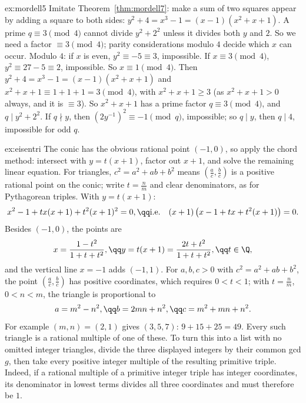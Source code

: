 \begin{solution}{ex:mordell5}
\idea Imitate Theorem~\ref{thm:mordell7}: make a sum of two squares appear by adding a square to both sides: $y^2+4=x^3-1=(x-1)(x^2+x+1)$. A prime $q\equiv3\pmod4$ cannot divide $y^2+2^2$ unless it divides both $y$ and $2$. So we need a factor $\equiv3\pmod4$; parity considerations modulo $4$ decide which $x$ can occur.
\writeup Modulo $4$: if $x$ is even, $y^2\equiv-5\equiv3$, impossible. If $x\equiv3\pmod4$, $y^2\equiv27-5\equiv2$, impossible. So $x\equiv1\pmod4$. Then $y^2+4=x^3-1=(x-1)(x^2+x+1)$ and $x^2+x+1\equiv1+1+1=3\pmod4$, with $x^2+x+1\ge3$ (as $x^2+x+1>0$ always, and it is $\equiv3$). So $x^2+x+1$ has a prime factor $q\equiv3\pmod4$, and $q\mid y^2+2^2$. If $q\nmid y$, then $\left(2y^{-1}\right)^2\equiv-1\pmod q$, impossible; so $q\mid y$, then $q\mid4$, impossible for odd $q$.
\end{solution}

\begin{solution}{ex:eisentri}
\idea The conic has the obvious rational point $(-1,0)$, so apply the chord method: intersect with $y=t(x+1)$, factor out $x+1$, and solve the remaining linear equation. For triangles, $c^2=a^2+ab+b^2$ means $(\frac ac,\frac bc)$ is a positive rational point on the conic; write $t=\frac nm$ and clear denominators, as for Pythagorean triples.
\writeup With $y=t(x+1)$:
\[\begin{gathered}x^2-1+tx(x+1)+t^2(x+1)^2=0,\qq\text{i.e.}\quad(x+1)\left(x-1+tx+t^2(x+1)\right)=0.\end{gathered}\]
Besides $(-1,0)$, the points are
\[
\begin{gathered}x=\frac{1-t^2}{1+t+t^2},\qq y=t(x+1)=\frac{2t+t^2}{1+t+t^2},\qq t\in\Q,\end{gathered}
\]
and the vertical line $x=-1$ adds $(-1,1)$. For $a,b,c>0$ with $c^2=a^2+ab+b^2$, the point $(\frac ac,\frac bc)$ has positive coordinates, which requires $0<t<1$; with $t=\frac nm$, $0<n<m$, the triangle is proportional to
\[
\begin{gathered}a=m^2-n^2,\qq b=2mn+n^2,\qq c=m^2+mn+n^2.\end{gathered}
\]
For example $(m,n)=(2,1)$ gives $(3,5,7)$: $9+15+25=49$. Every such triangle is a rational multiple of one of these. To turn this into a list with no omitted integer triangles, divide the three displayed integers by their common gcd $g$, then take every positive integer multiple of the resulting primitive triple. Indeed, if a rational multiple of a primitive integer triple has integer coordinates, its denominator in lowest terms divides all three coordinates and must therefore be $1$.
\end{solution}

